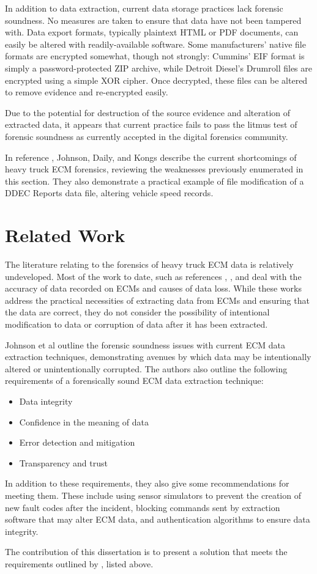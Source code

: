 In addition to data extraction, current data storage practices lack forensic soundness. No measures are taken to ensure that data have not been tampered
with. Data export formats, typically plaintext HTML or PDF documents, can easily be altered with readily-available software. Some manufacturers' native file formats are encrypted
somewhat, though not strongly: Cummins' EIF format is simply a password-protected ZIP archive, while Detroit Diesel's Drumroll files are encrypted using a simple XOR cipher.
Once decrypted, these files can be altered to remove evidence and re-encrypted easily\cite{Johnson2014}.

Due to the potential for destruction of the source evidence and alteration of extracted data, it appears that current practice fails to pass the litmus test of forensic soundness
as currently accepted in the digital forensics community.

In reference \cite{Johnson2014}, Johnson, Daily, and Kongs describe the current shortcomings of heavy truck ECM forensics, reviewing the weaknesses previously enumerated in this section. They also
demonstrate a practical example of file modification of a DDEC Reports data file, altering vehicle speed records.

\section{Related Work}

The literature relating to the forensics of heavy truck ECM data is relatively undeveloped. Most of the work to date, such as references \cite{reust2004}, \cite{steiner2013}, and \cite{austin2011} deal
with the accuracy of data recorded on ECMs and causes of data loss. While these works address the practical necessities of extracting data from ECMs and ensuring that the data are
correct, they do not consider the possibility of intentional modification to data or corruption of data after it has been extracted.

Johnson et al \cite{Johnson2014} outline the forensic soundness issues with current ECM data extraction techniques, demonstrating avenues by which data may be intentionally altered or unintentionally corrupted. The authors also outline the following requirements of a forensically sound ECM data extraction technique:

\begin{itemize}
  \item Data integrity
  \item Confidence in the meaning of data
  \item Error detection and mitigation
  \item Transparency and trust
\end{itemize}

In addition to these requirements, they also give some recommendations for meeting them. These include using sensor simulators to prevent the creation of new fault codes
after the incident, blocking commands sent by extraction software that may alter ECM data, and authentication algorithms to ensure data integrity.

The contribution of this dissertation is to present a solution that meets the requirements outlined by \cite{Johnson2014}, listed above.
